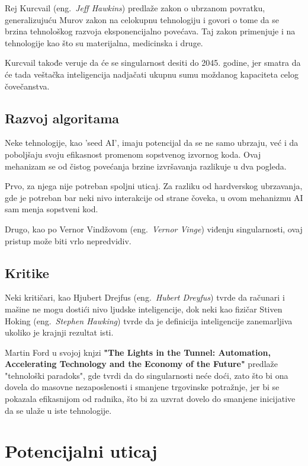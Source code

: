 \documentclass[a4paper]{article}
\begin{document}
Rej Kurcvail (eng.~{\em Jeff Hawkins}) predlaže zakon o ubrzanom povratku, generalizujuću Murov zakon na celokupnu tehnologiju i govori o tome da se brzina tehnološkog razvoja eksponencijalno povećava. Taj zakon primenjuje i na tehnologije kao što su materijalna, medicinska i druge.

Kurcvail takođe veruje da će se singularnost desiti do 2045. godine, jer smatra da će tada veštačka inteligencija nadjačati ukupnu sumu moždanog kapaciteta celog čovečanstva.


\subsection{Razvoj algoritama}

Neke tehnologije, kao 'seed AI', imaju potencijal da se ne samo ubrzaju, već i da poboljšaju svoju efikasnost promenom sopstvenog izvornog koda. 
Ovaj mehanizam se od čistog povećanja brzine izvršavanja razlikuje u dva pogleda.

Prvo, za njega nije potreban spoljni uticaj. Za razliku od hardverskog ubrzavanja, gde je potreban bar neki nivo interakcije od strane čoveka, u ovom mehanizmu AI sam menja sopstveni kod.

Drugo, kao po Vernor Vindžovom (eng.~{\em Vernor Vinge}) viđenju singularnosti, ovaj pristup može biti vrlo nepredvidiv. \cite{mog-8}

\subsection{Kritike}

Neki kritičari, kao Hjubert Drejfus (eng.~{\em Hubert Dreyfus}) tvrde da računari i mašine ne mogu dostići nivo ljudske inteligencije, dok neki kao fizičar Stiven Hoking (eng.~{\em Stephen Hawking}) tvrde da je definicija inteligencije zanemarljiva ukoliko je krajnji rezultat isti. 

Martin Ford u svojoj knjzi \textbf{"The Lights in the Tunnel: Automation, Accelerating Technology and the Economy of the Future"} predlaže "tehnološki paradoks", gde tvrdi da do singularnosti neće doći, zato što bi ona dovela do masovne nezaposlenosti i smanjene trgovinske potražnje, jer bi se pokazala efikasnijom od radnika, što bi za uzvrat dovelo do smanjene inicijative da se ulaže u iste tehnologije. \cite{mog-10}

\section{Potencijalni uticaj}
\label{sec:potencijalni_uticaj}
\hfill
\end{document}
